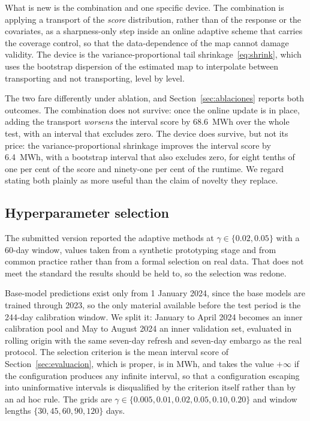 \documentclass[preprint,3p,times]{elsarticle}
\begin{document}
What is new is the combination and one specific device. The combination is applying a transport of the \emph{score} distribution, rather than of the response or the covariates, as a sharpness-only step inside an online adaptive scheme that carries the coverage control, so that the data-dependence of the map cannot damage validity. The device is the variance-proportional tail shrinkage~\eqref{eq:shrink}, which uses the bootstrap dispersion of the estimated map to interpolate between transporting and not transporting, level by level.

The two fare differently under ablation, and Section~\ref{sec:ablaciones} reports both outcomes. The combination does not survive: once the online update is in place, adding the transport \emph{worsens} the interval score by 68.6~MWh over the whole test, with an interval that excludes zero. The device does survive, but not its price: the variance-proportional shrinkage improves the interval score by 6.4~MWh, with a bootstrap interval that also excludes zero, for eight tenths of one per cent of the score and ninety-one per cent of the runtime. We regard stating both plainly as more useful than the claim of novelty they replace.

\subsection{Hyperparameter selection}
\label{sec:seleccion}

The submitted version reported the adaptive methods at $\gamma\in\{0.02,0.05\}$ with a 60-day window, values taken from a synthetic prototyping stage and from common practice rather than from a formal selection on real data. That does not meet the standard the results should be held to, so the selection was redone.

Base-model predictions exist only from 1 January 2024, since the base models are trained through 2023, so the only material available before the test period is the 244-day calibration window. We split it: January to April 2024 becomes an inner calibration pool and May to August 2024 an inner validation set, evaluated in rolling origin with the same seven-day refresh and seven-day embargo as the real protocol. The selection criterion is the mean interval score of Section~\ref{sec:evaluacion}, which is proper, is in MWh, and takes the value $+\infty$ if the configuration produces any infinite interval, so that a configuration escaping into uninformative intervals is disqualified by the criterion itself rather than by an ad hoc rule. The grids are $\gamma\in\{0.005,0.01,0.02,0.05,0.10,0.20\}$ and window lengths $\{30,45,60,90,120\}$ days.
\end{document}
